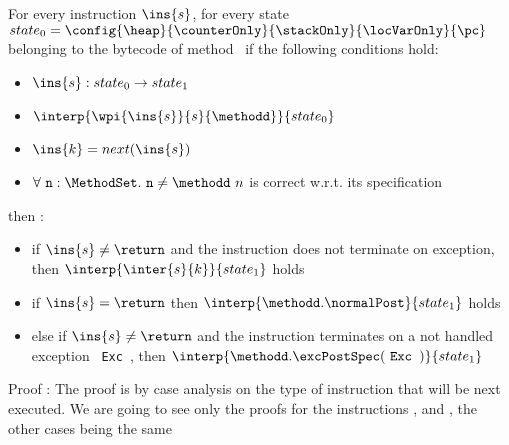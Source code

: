 \begin{lemma0} \label{lemma0}
For every instruction $\ins{s}$, for every state $state_0 =\config{\heap }{\counterOnly }{\stackOnly }{\locVarOnly }{\pc } $ 
    belonging to the bytecode of method \methodd \  if the following conditions hold: 
 \begin{itemize}
         \item $ \ins{s} : state_0 \rightarrow state_1$
         \item $ \interp{\wpi{\ins{s}}{s}{\methodd}}{state_0} $
	 \item  $\ins{k} = next( \ins{s} ) $
         \item    $ \forall \mbox{ \rm \texttt{n}} : \MethodSet . \mbox{ \rm \texttt{n}}   \neq \methodd \ n$ is correct w.r.t. its specification
 \end{itemize}
  
  then : 
 \begin{itemize}
         \item if  $ \ins{s} \neq \return $ and the instruction does not terminate on exception,
	       then  $ \interp{\inter{s}{k}}{state_1}  $   holds
        \item if  $ \ins{s} = \return $ then  $ \interp{\methodd.\normalPost}{state_1}  $   holds
	\item else if $ \ins{s} \neq \return $ and the instruction terminates on a not handled exception \mbox{ \rm\texttt{Exc }}, then
	      $ \interp{\methodd.\excPostSpec( \mbox{ \rm\texttt{Exc }} )}{state_1}  $ 
	
  \end{itemize} 
\end{lemma0}
Proof :
The proof is by case analysis on the type of instruction that will be next executed. 
We are going to see only the proofs for the instructions \return , \load and \invoke, the other cases being the same
